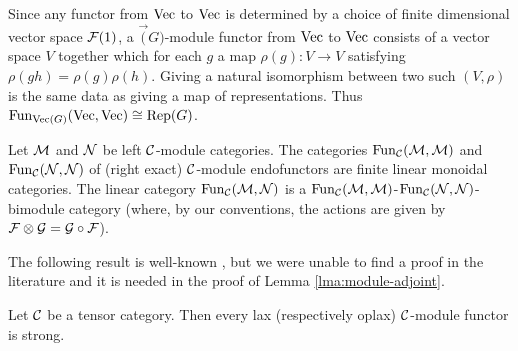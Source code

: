 \documentclass{amsart}
\begin{document}
\begin{example}
Since any functor from $\Vec$ to $\Vec$ is determined by a choice of finite dimensional vector space $\cF(1)$, a $\Vec(G)$-module functor from $\Vec$ to $\Vec$ consists of a vector space $V$ together which for each $g$ a map $\rho(g): V \rightarrow V$ satisfying $\rho(gh) = \rho(g)\rho(h)$.  Giving a natural isomorphism between two such $(V, \rho)$ is the same data as giving a map of representations.  Thus $\Fun_{\Vec(G)}(\Vec, \Vec) \cong \Rep(G)$.
\end{example}

\begin{example}
	Let $\cM$ and $\cN$ be left $\cC$-module categories. The categories $\Fun_{\cC}(\cM, \cM)$ and $\Fun_{\cC}(\cN, \cN)$ of (right exact) $\cC$-module endofunctors are finite linear monoidal categories. The linear category $\Fun_{\cC}(\cM, \cN)$ is a $\Fun_{\cC}(\cM, \cM)$-$\Fun_{\cC}(\cN, \cN)$-bimodule category (where, by our conventions, the actions are given by $\cF \otimes \cG = \cG \circ \cF$). 
\end{example}


The following result is well-known \cite[Rmk 4]{MR1976459}, but we were unable to find a proof in the literature and it is needed in the proof of Lemma  \ref{lma:module-adjoint}.

\begin{lemma} \label{lem:laxisstrong}
	Let $\cC$ be a tensor category. Then every lax (respectively oplax) $\cC$-module functor is strong.  
\end{lemma} 
\end{document}
